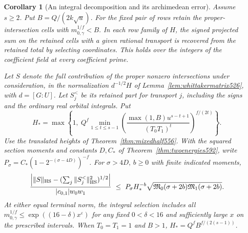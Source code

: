 \documentclass[a4paper,11pt]{article}
\newtheorem{corollary}[proposition]{Corollary}
\theoremstyle{definition}
\theoremstyle{remark}
\numberwithin{equation}{section}
\begin{document}
\begin{corollary}[An integral decomposition and its archimedean error]
\leavevmode\label{cor:properperiod602}
Assume \(s\ge2\). Put \(B=Q/(2k\sqrt u)\). For the fixed pair
of rows retain the proper-intersection cells with
\(m_{0,\gamma}^{1/f}<B\). In each row family of \(H\), the
signed projected sum on the retained cells with a given
rational transport is recovered from the retained total by
selecting coordinates. This holds over the integers of the
coefficient field at every coefficient prime.

Let \(S\) denote the full contribution of the proper nonzero
intersections under consideration, in the normalization
\(d^{-1/2}H\) of Lemma~\ref{lem:whittakermatrix526}, with
\(d=[G:U]\). Let \(S_j^{<}\) be its retained part for transport
\(j\), including the signs and the ordinary real orbital
integrals. Put
\[
 H_*=\max\left\{1,\;Q^f\min_{1\le t\le s-1}
   \left(\frac{\max(1,B)u^{s-t+1}}{(T_0T_1)^t}\right)^{f/(2t)}
                    \right\}.
\]
Use the translated heights of Theorem~\ref{thm:mixedhalf556}.
With the squared section moments and constants \(D,C_*\) of
Theorem~\ref{thm:twoenergies592}, write
\(P_\sigma=C_*(1-2^{-(\sigma-4D)})^{-f}\).
For \(\sigma>4D,\ b\ge0\) with finite indicated moments,
\[
 \frac{\left|\|S\|_{\rm HS}
              -(\sum_j\|S_j^{<}\|_{\rm HS}^2)^{1/2}\right|}
      {|c_{0,1}|w_0w_1}
 \ \le\ P_\sigma H_*^{-b}
       \sqrt{\mathfrak M_0(\sigma+2b)\mathfrak M_1(\sigma+2b)} .
\]
At either equal terminal norm, the integral selection includes
all \(m_{0,\gamma}^{1/f}\le\exp((16-\delta)x^\varepsilon)\)
for any fixed \(0<\delta<16\) and sufficiently large \(x\)
on the prescribed intervals. When \(T_0=T_1=1\) and \(B>1\),
\(H_*=Q^f B^{f/(2(s-1))}\).
\end{corollary}
\end{document}
